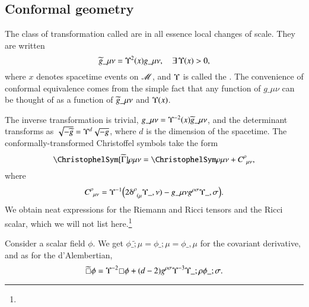\subsection{Conformal geometry}\label{sec:GR:diffgeo:conformal}
    The class of transformation called  are in all essence local changes of scale. They are written
    \begin{equation}\label{eq:GR:diffgeo:conformal_trafo}
        \widetilde{g}\_{\mu\nu} = \Upsilon^2(x) g\_{\mu\nu} , \quad \exists\, \Upsilon(x) > 0,
    \end{equation}
    where $x$ denotes spacetime events on $\mathscr{M}$, and $\Upsilon$ is called the . The convenience of conformal equivalence comes from the simple fact that any function of $g\_{\mu\nu}$ can be thought of as a function of $\widetilde{g}\_{\mu\nu}$ and $\Upsilon(x)$. 



    The inverse transformation is trivial, $g\_{\mu\nu} = \Upsilon^{-2}(x)\widetilde{g}\_{\mu\nu}$, and the determinant transforms as $\sqrt{-\widetilde{g}}= \Upsilon^d \sqrt{-g}$, where $d$ is the dimension of the spacetime. The conformally-transformed Christoffel symbols take the form
    \begin{equation}
        \Chr[\wt{\Gamma}]{\rho}{\mu\nu} = \Chr{\rho}{\mu\nu}  + C\indices{^\rho_{\mu\nu}},
    \end{equation}
    where 
    \begin{equation}
        C\indices{^\rho_{\mu\nu}} = \cfac^{-1} 
        \pclosed{ 2\Krondelta{^\rho_{(\mu}} \cfac\_{,\nu)}  - g\_{\mu\nu} g\^{\rho\sigma} \cfac\_{,\sigma} }.
    \end{equation}
    We obtain neat expressions for the Riemann and Ricci tensors and the Ricci scalar, which we will not list here.\footnote{}

    Consider a scalar field $\phi$. We get  $\phi\_{\tilde{;}\mu}= \phi\_{;\mu} = \phi\_{,\mu}$ %
    for the covariant derivative, and as for the d'Alembertian, 
    \begin{equation}
        \wt{\sq} \phi = \cfac^{-2} \sq \phi + (d-2) g\^{\rho \sigma } \cfac^{-3} \cfac\_{;\rho} \phi\_{;\sigma}.
    \end{equation}



